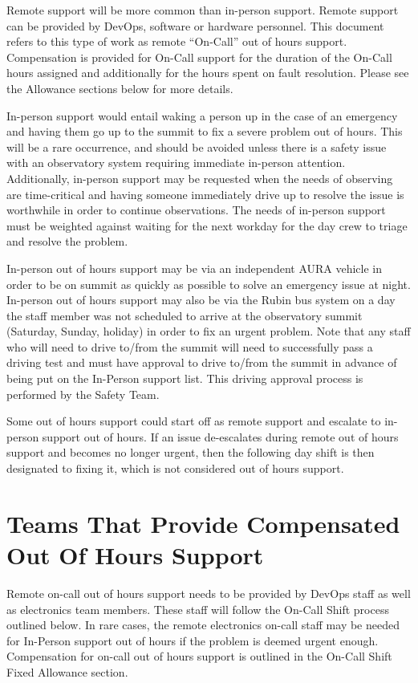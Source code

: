 Remote support will be more common than in-person support.  
Remote support can be provided by DevOps, software or hardware personnel.  This document refers to this type of work as remote ``On-Call'' out of hours support. Compensation is provided for On-Call support for the duration of the On-Call hours assigned and additionally for the hours spent on fault resolution.  Please see the Allowance sections below for more details.

In-person support would entail waking a person up in the case of an emergency and having them go up to the summit to fix a severe problem out of hours. 
This will be a rare occurrence, and should be avoided unless there is a safety issue with an observatory system requiring immediate in-person attention.
Additionally, in-person support may be requested when the needs of observing are time-critical and having someone immediately drive up to resolve the issue is worthwhile in order to continue observations.  
The needs of in-person support must be weighted against waiting for the next workday for the day crew to triage and resolve the problem.

In-person out of hours support may be via an independent AURA vehicle in order to be on summit as quickly as possible to solve an emergency issue at night.  In-person out of hours support may also be via the Rubin bus system on a day the staff member was not scheduled to arrive at the observatory summit (Saturday, Sunday, holiday) in order to fix an urgent problem.  Note that any staff who will need to drive to/from the summit will need to successfully pass a driving test and must have approval to drive to/from the summit in advance of being put on the In-Person support list.  This driving approval process is performed by the Safety Team.

Some out of hours support could start off as remote support and escalate to in-person support out of hours.  If an issue de-escalates during remote out of hours support and becomes no longer urgent, then the following day shift is then designated to fixing it, which is not considered out of hours support.

\section{Teams That Provide Compensated Out Of Hours Support}

Remote on-call out of hours support needs to be provided by DevOps staff as well as electronics team members.  These staff will follow the On-Call Shift process outlined below.  In rare cases, the remote electronics on-call staff may be needed for In-Person support out of hours if the problem is deemed urgent enough.  Compensation for on-call out of hours support is outlined in the On-Call Shift Fixed Allowance section.

